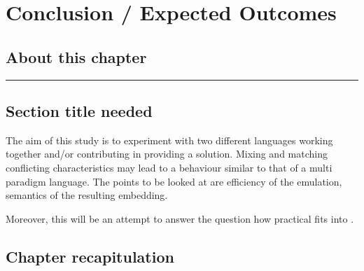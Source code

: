 \documentclass[thesis-solanki.tex]{subfiles}
\begin{document}
\chapter{Conclusion / Expected Outcomes}\label{chap:conclusion}


\section{About this chapter}

\noindent\rule{\textwidth}{0.5pt}


\begin{comment}
As we have seen there have been a number of attempts at solving the problem and so have been the issues. First and foremost, with appropriate  documentation the resulting library should be easy to use. Writing a program must be very much the same as writing a program in the host language. With the introduction of few new constructs defining
\end{comment}

\section{Section title needed}
The aim of this study is to experiment with two different languages working together and/or contributing in providing a solution. Mixing and matching conflicting characteristics may lead to a behaviour similar to that of a multi paradigm language. The points to be looked at are efficiency of the emulation, semantics of the resulting embedding.

Moreover, this will be an attempt to answer the question how practical  fits into .                  


\section{Chapter recapitulation}

\ifMain
\begin{scope}
  \nolinenumbers
  \enotesize
  \par
  \begin{singlespace}
  \setlength{\parskip}{12pt plus 2pt minus 1pt}
  \theendnotes
  \par
  \end{singlespace}
\end{scope}
\fi
\end{document}

